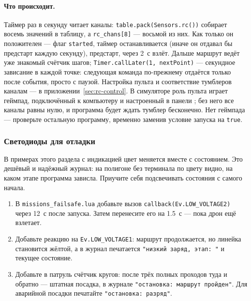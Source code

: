 \paragraph{Что происходит.} Таймер раз в секунду читает каналы: \verb|table.pack(Sensors.rc())| собирает восемь значений в таблицу, а \verb|rc_chans[8]| --- восьмой из них. Как только он положителен --- флаг \verb|started|, таймер останавливается (иначе он отдавал бы предстарт каждую секунду), предстарт, через 2~с взлёт. Дальше маршрут ведёт уже знакомый счётчик шагов; \verb|Timer.callLater(1, nextPoint)| --- секундное зависание в каждой точке: следующая команда по-прежнему отдаётся только после события, просто с паузой. Настройка пульта и соответствие тумблеров каналам --- в приложении~\ref{sec:rc-control}. В симуляторе роль пульта играет геймпад, подключённый к компьютеру и настроенный в панели ; без него все каналы равны нулю, и программа будет ждать тумблер бесконечно. Нет геймпада --- проверьте остальную программу, временно заменив условие запуска на \verb|true|.

\subsubsection*{Светодиоды для отладки}

В примерах этого раздела с индикацией цвет меняется вместе с состоянием. Это дешёвый и надёжный журнал: на полигоне без терминала по цвету видно, на каком этапе программа зависла. Приучите себя подсвечивать состояния с самого начала.

\begin{taskbox}
\begin{enumerate}
  \item В \texttt{missions\_failsafe.lua} добавьте вызов \verb|callback(Ev.LOW_VOLTAGE2)| через 12~с после запуска. Затем перенесите его на 1.5~с --- пока дрон ещё взлетает.
  \item Добавьте реакцию на \verb|Ev.LOW_VOLTAGE1|: маршрут продолжается, но линейка становится жёлтой, а в журнал печатается \verb|"низкий заряд, этап: "| и текущее состояние.
  \item Добавьте в патруль счётчик кругов: после трёх полных проходов туда и обратно --- штатная посадка, в журнале \verb|"остановка: маршрут пройден"|. Для аварийной посадки печатайте \verb|"остановка: разряд"|.
\end{enumerate}
\end{taskbox}
